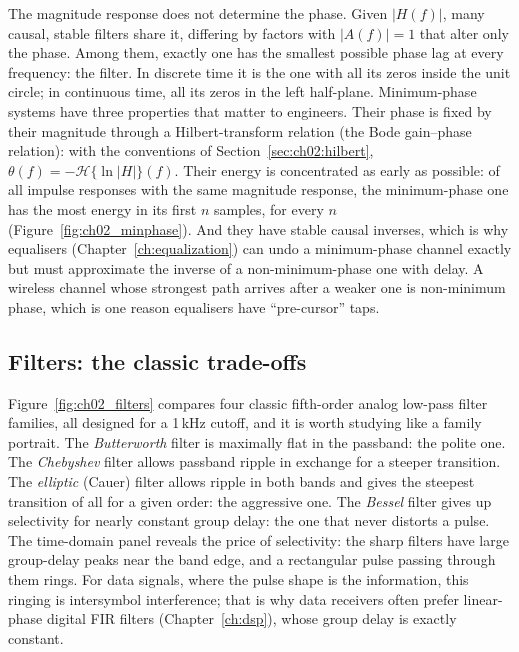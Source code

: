 The magnitude response does not determine the phase. Given $|H(f)|$, many causal, stable filters
share it, differing by  factors with $|A(f)|=1$ that alter only the phase. Among them,
exactly one has the smallest possible phase lag at every frequency: the  filter.
In discrete time it is the one with all its zeros inside the unit circle; in continuous time, all its
zeros in the left half-plane. Minimum-phase systems have three properties that matter to engineers.
Their phase is fixed by their magnitude through a Hilbert-transform relation (the Bode gain--phase
relation): with the conventions of Section~\ref{sec:ch02:hilbert}, $\theta(f)=-\mathcal H\{\ln|H|\}(f)$.
Their energy is concentrated as early as possible: of all impulse responses with the same
magnitude response, the minimum-phase one has the most energy in its first $n$ samples, for every
$n$ (Figure~\ref{fig:ch02_minphase}). And they have stable causal inverses, which is why equalisers
(Chapter~\ref{ch:equalization}) can undo a minimum-phase channel exactly but must approximate the
inverse of a non-minimum-phase one with delay. A wireless channel whose strongest path arrives after a
weaker one is non-minimum phase, which is one reason equalisers have ``pre-cursor'' taps.


\subsection{Filters: the classic trade-offs}

Figure~\ref{fig:ch02_filters} compares four classic fifth-order analog low-pass filter
families, all designed for a 1\,kHz cutoff, and it is worth studying like a family portrait. The
\emph{Butterworth} filter is maximally flat in the passband: the polite one. The \emph{Chebyshev}
filter allows passband ripple in exchange for a steeper transition. The \emph{elliptic} (Cauer)
filter allows ripple in both bands and gives the steepest transition of all for a given order: the
aggressive one. The \emph{Bessel} filter gives up selectivity for nearly constant group delay: the
one that never distorts a pulse. The time-domain panel reveals the price of selectivity: the sharp
filters have large group-delay peaks near the band edge, and a rectangular pulse passing through
them rings. For data signals, where the pulse shape is the information, this ringing is intersymbol
interference; that is why data receivers often prefer linear-phase digital FIR filters
(Chapter~\ref{ch:dsp}), whose group delay is exactly constant.

